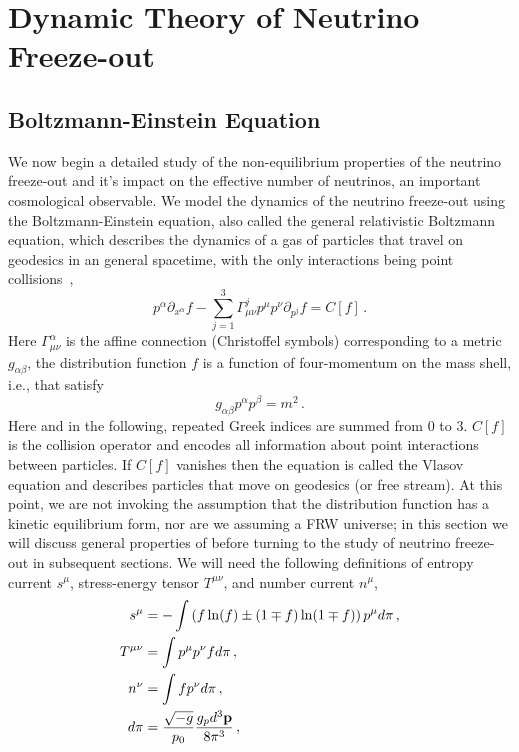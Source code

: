 \section{Dynamic Theory of Neutrino Freeze-out}\label{part3}
\subsection{Boltzmann-Einstein Equation}\label{sec:Boltzmann_Einstein}
We now begin a detailed study of the non-equilibrium properties of the neutrino freeze-out and it's impact on the effective number of neutrinos, an important cosmological observable. We model the dynamics of the neutrino freeze-out using the Boltzmann-Einstein equation, also called the general relativistic Boltzmann equation, which describes the dynamics of a gas of particles that travel on geodesics in an general spacetime, with the only interactions being point collisions~\cite{Andreasson:2011ng,cercignani,Choquet-Bruhat:2009xil,ehlers},
\begin{equation}\label{boltzmann_einstein}
p^\alpha\partial_{x^\alpha}f-\sum_{j=1}^3\Gamma^j_{\mu\nu}p^\mu p^\nu\partial_{p^j}f=C[f]\,.
\end{equation}
Here $ \Gamma^\alpha_{\mu\nu}$ is the affine connection (Christoffel symbols) corresponding to a metric $g_{\alpha\beta}$,   the distribution function $f$ is a function of four-momentum on the mass shell, i.e., that satisfy
 \begin{equation}
g_{\alpha\beta}p^\alpha p^\beta=m^2\,.
\end{equation}
Here and in the following,  repeated Greek indices are summed from $0$ to $3$.  $C[f]$ is the collision operator and encodes all information about point interactions between particles.  If $C[f]$ vanishes then the equation is called the Vlasov equation and describes particles that move on geodesics (or free stream).  At this point, we are  not invoking the assumption that the distribution function has a kinetic equilibrium form, nor are we assuming a FRW universe; in this section we will discuss  general properties of  before turning to the study of neutrino freeze-out in subsequent sections.   We will need the following definitions of entropy current $s^\mu$, stress-energy tensor ${T}^{\mu\nu}$, and number current $n^\mu$,
\begin{align}
\label{smdef} s^\mu&=-\int \left(f\ln(f)\pm(1\mp f)\ln(1\mp f)\right)p^\mu d\pi\,,\\
\label{Tmndef}{T}^{\mu\nu}&=\int p^\mu p^\nu f d\pi\,,\\
\label{nmdef} n^\nu&=\int f p^\nu d\pi\,,\\
d\pi&=\frac{\sqrt{-g}}{p_0}\frac{g_pd^3{\bf p}}{8\pi^3}\,,
\end{align}
